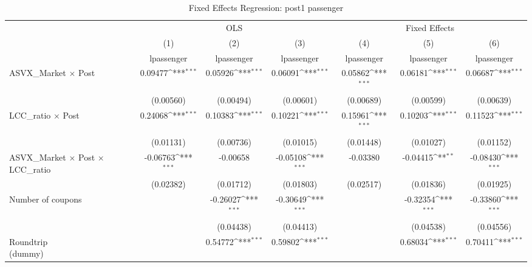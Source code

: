 \begin{table}[htbp]\centering
\def\sym#1{\ifmmode^{#1}\else\(^{#1}\)\fi}
\caption{Fixed Effects Regression: post1 passenger}
\begin{tabular}{l*{6}{c}}
\toprule
                    &\multicolumn{3}{c}{OLS}                                          &\multicolumn{3}{c}{Fixed Effects}                                \\\cmidrule(lr){2-4}\cmidrule(lr){5-7}
                    &\multicolumn{1}{c}{(1)}&\multicolumn{1}{c}{(2)}&\multicolumn{1}{c}{(3)}&\multicolumn{1}{c}{(4)}&\multicolumn{1}{c}{(5)}&\multicolumn{1}{c}{(6)}\\
                    &\multicolumn{1}{c}{lpassenger}&\multicolumn{1}{c}{lpassenger}&\multicolumn{1}{c}{lpassenger}&\multicolumn{1}{c}{lpassenger}&\multicolumn{1}{c}{lpassenger}&\multicolumn{1}{c}{lpassenger}\\
\midrule
ASVX\_Market $\times$ Post&     0.09477\sym{***}&     0.05926\sym{***}&     0.06091\sym{***}&     0.05862\sym{***}&     0.06181\sym{***}&     0.06687\sym{***}\\
                    &   (0.00560)         &   (0.00494)         &   (0.00601)         &   (0.00689)         &   (0.00599)         &   (0.00639)         \\
\addlinespace
LCC\_ratio $\times$ Post&     0.24068\sym{***}&     0.10383\sym{***}&     0.10221\sym{***}&     0.15961\sym{***}&     0.10203\sym{***}&     0.11523\sym{***}\\
                    &   (0.01131)         &   (0.00736)         &   (0.01015)         &   (0.01448)         &   (0.01027)         &   (0.01152)         \\
\addlinespace
ASVX\_Market $\times$ Post $\times$ LCC\_ratio&    -0.06763\sym{***}&    -0.00658         &    -0.05108\sym{***}&    -0.03380         &    -0.04415\sym{**} &    -0.08430\sym{***}\\
                    &   (0.02382)         &   (0.01712)         &   (0.01803)         &   (0.02517)         &   (0.01836)         &   (0.01925)         \\
\addlinespace
Number of coupons   &                     &    -0.26027\sym{***}&    -0.30649\sym{***}&                     &    -0.32354\sym{***}&    -0.33860\sym{***}\\
                    &                     &   (0.04438)         &   (0.04413)         &                     &   (0.04538)         &   (0.04556)         \\
\addlinespace
\shortstack{Roundtrip \\ (dummy)}&                     &     0.54772\sym{***}&     0.59802\sym{***}&                     &     0.68034\sym{***}&     0.70411\sym{***}\\

\end{tabular}
\end{table}
